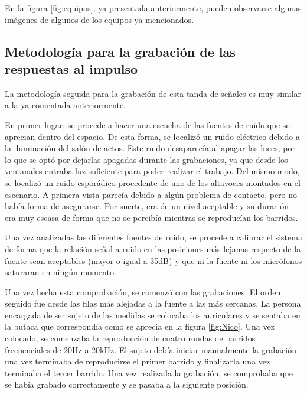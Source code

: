 \documentclass[11pt,a4paper,twoside]{book}
\begin{document}
            En la figura \ref{fig:equipos}, ya presentada anteriormente, pueden observarse algunas imágenes de algunos de los equipos ya mencionados.
                
        \subsection{Metodología para la grabación de las respuestas al impulso}
            La metodología seguida para la grabación de esta tanda de señales es muy similar a la ya comentada anteriormente.
                
            En primer lugar, se procede a hacer una escucha de las fuentes de ruido que se aprecian dentro del espacio. De esta forma, se localizó un ruido eléctrico debido a la iluminación del salón de actos. Este ruido desaparecía al apagar las luces, por lo que se optó por dejarlas apagadas durante las grabaciones, ya que desde los ventanales entraba luz suficiente para poder realizar el trabajo. Del mismo modo, se localizó un ruido esporádico procedente de uno de los altavoces montados en el escenario. A primera vista parecía debido a algún problema de contacto, pero no había forma de asegurarse. Por suerte, era de un nivel aceptable y su duración era muy escasa de forma que no se percibía mientras se reproducían los barridos.
                
            Una vez analizadas las diferentes fuentes de ruido, se procede a calibrar el sistema de forma que la relación señal a ruido en las posiciones más lejanas respecto de la fuente sean aceptables (mayor o igual a 35dB) y que ni la fuente ni los micrófonos saturaran en ningún momento.
                
            Una vez hecha esta comprobación, se comenzó con las grabaciones. El orden seguido fue desde las filas más alejadas a la fuente a las más cercanas. La persona encargada de ser sujeto de las medidas se colocaba los auriculares y se sentaba en la butaca que correspondía como se aprecia en la figura \ref{fig:Nico}. Una vez colocado, se comenzaba la reproducción de cuatro rondas de barridos frecuenciales de 20Hz a 20kHz. El sujeto debía iniciar manualmente la grabación una vez terminaba de reproducirse el primer barrido y finalizarla una vez terminaba el tercer barrido. Una vez realizada la grabación, se comprobaba que se había grabado correctamente y se pasaba a la siguiente posición. 
                
\end{document}
